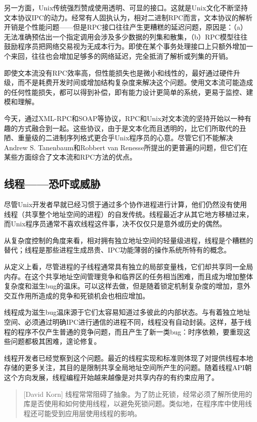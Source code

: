 \documentclass[12pt,oneside]{book}
\begin{document}
另一方面，Unix传统强烈赞成使用透明、可显的接口。这就是Unix文化不断坚持文本协议IPC的动力。经常有人固执认为，相对二进制RPC而言，文本协议的解析开销是个性能问题——但是RPC接口往往产生更糟糕的延迟问题，原因是：（a）无法准确预估出一个指定调用会涉及多少数据的列集和散集，（b）RPC模型往往鼓励程序员把网络交易视为无成本行为。即使在某个事务处理接口上只额外增加一个来回，往往也会增加足够多的网络延迟，完全抵消了解析或列集的开销。

即使文本流没有RPC效率高，但性能损失也是微小和线性的，最好通过硬件升级，而不是耗费开发时间或增加结构复杂度来解决这个问题。使用文本流可能造成的任何性能损失，都可以得到补偿，即有能力设计更简单的系统，更易于监控、建模和理解。

今天，通过XML-RPC和SOAP等协议，RPC和Unix对文本流的坚持开始以一种有趣的方式融合到一起。这些协议，由于是文本化而且透明的，比它们所取代的丑陋、重量级的二进制序列格式更合乎Unix程序员的心意。尽管它们不能解决Andrew S. Tanenbaum和Robbert van Renesse所提出的更普遍的问题，但它们在某些方面综合了文本流和RPC方法的优点。

\subsection{线程——恐吓或威胁}
尽管Unix开发者早就已经习惯于通过多个协作进程进行计算，他们仍然没有使用线程（共享整个地址空间的进程）的自发传统。线程最近才从其它地方移植过来，而Unix程序员通常不喜欢线程这件事，决不仅仅只是意外或历史的偶然。

从复杂度控制的角度来看，相对拥有独立地址空间的轻量级进程，线程是个糟糕的替代；线程是那些进程生成昂贵、IPC功能薄弱的操作系统所特有的概念。

从定义上看，尽管进程的子线程通常具有独立的局部变量栈，它们却共享同一全局内存。在这个共享地址空间管理竞争和临界区的任务相当困难，而且成为增加整体复杂度和滋生bug的温床。可以这样去做，但是随着锁定机制复杂度的增加，意外交互作用所造成的竞争和死锁机会也相应增加。

线程成为滋生bug温床源于它们太容易知道过多彼此的内部状态。与有着独立地址空间、必须通过明确IPC进行通信的进程不同，线程没有自动封装。这样，基于线程的程序不仅产生普通的竞争问题，而且产生了新一类bug：时序依赖，要重现这些问题都极其困难，遑论修复。

线程开发者已经觉察到这个问题。最近的线程实现和标准则体现了对提供线程本地存储的更多关注，其目的是限制共享全局地址空间所产生的问题。随着线程API朝这个方向发展，线程编程开始越来越像是对共享内存的有约束应用了。

\begin{quote}[David Korn]
线程常常阻碍了抽象。为了防止死锁，经常必须了解所使用的库是否使用和如何使用线程，以避免死锁问题。类似地，在程序库中使用线程还可能受到应用层使用线程的影响。
\end{quote}
\end{document}

